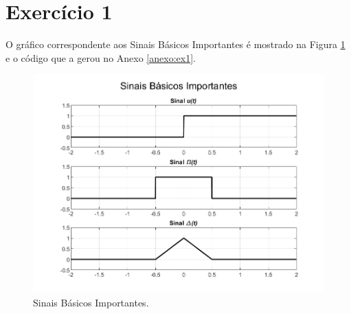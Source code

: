 \documentclass[a4paper,12pt,oneside,openany,table,xcdraw]{article}
\begin{document}
\newcommand{\thedepartment}{Faculdade de Engenharia Elétrica}
\newcommand{\thecourse}{FEELT}
\newcommand{\thetitle}{Resolução da Lista de Exercícios 1}
\newcommand{\thetype}{Trabalho de Princípios de Comunição}
\newcommand{\theproftitle}{Bacharel em Engenharia Elétrica}
\newcommand{\thestudent}{Lesly Viviane Montúfar Berrios\\
\centering11811ETE001}
\newcommand{\theadvisor}{Prof. Lorenço Santos Vasconcelos}
\newcommand{\thecity}{Uberlândia}

\thispagestyle{empty}



\onehalfspacing
\tableofcontents %
\newpage

\section{Exercício 1}
O gráfico correspondente aos Sinais Básicos Importantes é mostrado na Figura \ref{ex1:figure} e o código que a gerou no Anexo \ref{anexo:ex1}.

\vspace{0.4cm}
\begin{figure}[H]
\centering
\includegraphics[width=16cm]{ex1-fig}
\caption{Sinais Básicos Importantes.}
\label{ex1:figure}
\end{figure}
\end{document}
